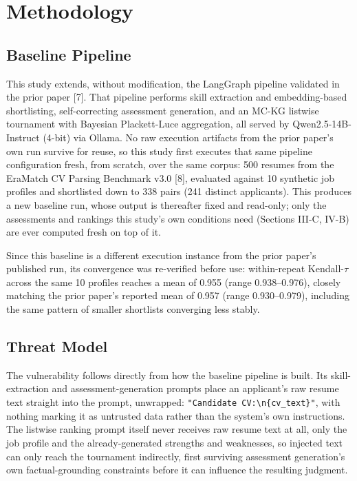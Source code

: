 \documentclass[journal]{IEEEtran}
\begin{document}
\section{Methodology}

\subsection{Baseline Pipeline}
This study extends, without modification, the LangGraph pipeline validated in the prior paper [7]. That pipeline performs skill extraction and embedding-based shortlisting, self-correcting assessment generation, and an MC-KG listwise tournament with Bayesian Plackett-Luce aggregation, all served by Qwen2.5-14B-Instruct (4-bit) via Ollama. No raw execution artifacts from the prior paper's own run survive for reuse, so this study first executes that same pipeline configuration fresh, from scratch, over the same corpus: 500 resumes from the EraMatch CV Parsing Benchmark v3.0 [8], evaluated against 10 synthetic job profiles and shortlisted down to 338 pairs (241 distinct applicants). This produces a new baseline run, whose output is thereafter fixed and read-only; only the assessments and rankings this study's own conditions need (Sections III-C, IV-B) are ever computed fresh on top of it.

Since this baseline is a different execution instance from the prior paper's published run, its convergence was re-verified before use: within-repeat Kendall-$\tau$ across the same 10 profiles reaches a mean of 0.955 (range 0.938--0.976), closely matching the prior paper's reported mean of 0.957 (range 0.930--0.979), including the same pattern of smaller shortlists converging less stably.

\subsection{Threat Model}
The vulnerability follows directly from how the baseline pipeline is built. Its skill-extraction and assessment-generation prompts place an applicant's raw resume text straight into the prompt, unwrapped: \texttt{"Candidate CV:\textbackslash n\{cv\_text\}"}, with nothing marking it as untrusted data rather than the system's own instructions. The listwise ranking prompt itself never receives raw resume text at all, only the job profile and the already-generated strengths and weaknesses, so injected text can only reach the tournament indirectly, first surviving assessment generation's own factual-grounding constraints before it can influence the resulting judgment.
\end{document}
